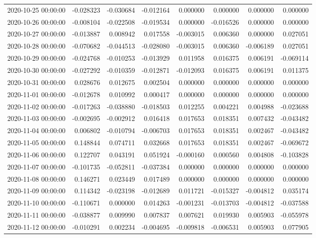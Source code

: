 \begin{tabular}{lrrrrrrr}
2020-10-25 00:00:00 & -0.028323 & -0.030684 & -0.012164 & 0.000000 & 0.000000 & 0.000000 & 0.000000 \\
2020-10-26 00:00:00 & -0.008104 & -0.022508 & -0.019534 & 0.000000 & -0.016526 & 0.000000 & 0.000000 \\
2020-10-27 00:00:00 & -0.013887 & 0.008942 & 0.017558 & -0.003015 & 0.006360 & 0.000000 & 0.027051 \\
2020-10-28 00:00:00 & -0.070682 & -0.044513 & -0.028080 & -0.003015 & 0.006360 & -0.006189 & 0.027051 \\
2020-10-29 00:00:00 & -0.024768 & -0.010253 & -0.013929 & 0.011958 & 0.016375 & 0.006191 & -0.069114 \\
2020-10-30 00:00:00 & -0.027292 & -0.010359 & -0.012871 & -0.012093 & 0.016375 & 0.006191 & 0.011375 \\
2020-10-31 00:00:00 & 0.028676 & 0.012675 & 0.002504 & 0.000000 & 0.000000 & 0.000000 & 0.000000 \\
2020-11-01 00:00:00 & -0.012678 & 0.010992 & 0.000417 & 0.000000 & 0.000000 & 0.000000 & 0.000000 \\
2020-11-02 00:00:00 & -0.017263 & -0.038880 & -0.018503 & 0.012255 & 0.004221 & 0.004988 & -0.023688 \\
2020-11-03 00:00:00 & -0.002695 & -0.002912 & 0.016418 & 0.017653 & 0.018351 & 0.007432 & -0.043482 \\
2020-11-04 00:00:00 & 0.006802 & -0.010794 & -0.006703 & 0.017653 & 0.018351 & 0.002467 & -0.043482 \\
2020-11-05 00:00:00 & 0.148844 & 0.074711 & 0.032668 & 0.017653 & 0.018351 & 0.002467 & -0.069672 \\
2020-11-06 00:00:00 & 0.122707 & 0.043191 & 0.051924 & -0.000160 & 0.000560 & 0.004808 & -0.103828 \\
2020-11-07 00:00:00 & -0.101735 & -0.052811 & -0.037384 & 0.000000 & 0.000000 & 0.000000 & 0.000000 \\
2020-11-08 00:00:00 & 0.146271 & 0.023449 & 0.017489 & 0.000000 & 0.000000 & 0.000000 & 0.000000 \\
2020-11-09 00:00:00 & 0.114342 & -0.023198 & -0.012689 & 0.011721 & -0.015327 & -0.004812 & 0.035174 \\
2020-11-10 00:00:00 & -0.110671 & 0.000000 & 0.014263 & -0.001231 & -0.013703 & -0.004812 & -0.037588 \\
2020-11-11 00:00:00 & -0.038877 & 0.009990 & 0.007837 & 0.007621 & 0.019930 & 0.005903 & -0.055978 \\
2020-11-12 00:00:00 & -0.010291 & 0.002234 & -0.004695 & -0.009818 & -0.006531 & 0.005903 & 0.077905 \\

\end{tabular}

